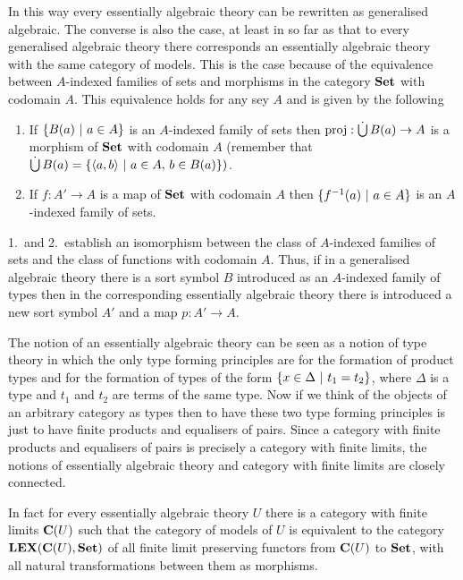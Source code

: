 
In this way every essentially algebraic theory can be rewritten as generalised algebraic.
%
The converse is also the case, at least in so far as that to every generalised algebraic theory there corresponds an essentially algebraic theory with the same category of models.
%
This is the case because of the equivalence between $A$-indexed families of sets and morphisms in the category $\mathbf{Set}$ with codomain $A$.
%
This equivalence holds for any sey $A$ and is given by the following

\begin{enumerate}[1.]
 	\item If $\{ B(a) \ |\  a \in A \}$ is an $A$-indexed family of sets then $\operatorname{proj} : \mathop{\dot{\bigcup}} B(a) \to A$ is a morphism of $\mathbf{Set}$ with codomain $A$ (remember that $\mathop{\dot{\bigcup}} B(a) = \{\langle a,b \rangle \ |\  a \in A,\, b \in B(a) \})$.
	\item If $f : A' \to A$ is a map of $\mathbf{Set}$ with codomain $A$ then $\{ f^{-1}(a) \ |\  a \in A \}$ is an $A$-indexed family of sets.
\end{enumerate}	

1.\ and 2.\ establish an isomorphism between the class of $A$-indexed families of sets and the class of functions with codomain $A$.
%
%
Thus, if in a generalised algebraic theory there is a sort symbol $B$ introduced as an $A$-indexed family of types then in the corresponding essentially algebraic theory there is introduced a new sort symbol $A'$ and a map $p : A' \to A$.

The notion of an essentially algebraic theory can be seen as a notion of type theory in which the only type forming principles are for the formation of product types and for the formation of types of the form $\{ x \in \Delta \ |\  t_1 = t_2 \}$, where $\Delta$ is a type and $t_1$ and $t_2$ are terms of the same type.
%
Now if we think of the objects of an arbitrary category as types then to have these two type forming principles is just to have finite products and equalisers of pairs.
%
%
Since a category with finite products and equalisers of pairs is precisely a category with finite limits, the notions of essentially algebraic theory and category with finite limits are closely connected.

In fact for every essentially algebraic theory $U$ there is a category with finite limits $\mathbf{C}(U)$ such that the category of models of $U$ is equivalent to the category $\mathbf{LEX}(\mathbf{C}(U),\mathbf{Set})$ of all finite limit preserving functors from $\mathbf{C}(U)$ to $\mathbf{Set}$, with all natural transformations between them as morphisms.

